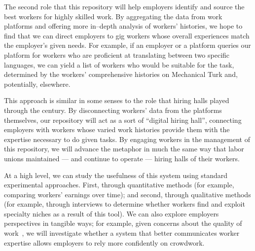 \documentclass{article}
\newcommand{\topic}[1]{{\color{Blue}#1}}
\renewcommand{\topic}[1]{{#1}}
\begin{document}
\topic{The second role that this repository will help employers identify and source the best workers for highly skilled work.}
By aggregating the data from work platforms and
offering more in--depth analysis of workers' histories, we hope to find that
we can direct employers to gig workers whose overall experiences match the employer's given needs.
For example, if an employer or a platform queries our platform for
workers who are proficient at translating between two specific languages,
we can yield a list of workers who would be suitable for the task, determined by
the workers' comprehensive histories on Mechanical Turk and, potentially, elsewhere.

\topic{This approach is similar in some senses to the role that hiring halls played through the \nth{20} century.}
By disconnecting workers' data from the platforms themselves, our repository will act as a sort of ``digital hiring hall'',
connecting employers with workers whose varied work histories provide them with the expertise necessary to do given tasks.
By engaging workers in the management of this repository, we will advance the metaphor in much the same way that
labor unions maintained --- and continue to operate --- hiring halls of their workers.


\topic{At a high level, we can study the usefulness of this system using standard experimental approaches.}
First, through quantitative methods (for example, comparing workers' earnings over time); and
second, through qualitative  methods (for example, through interviews to determine whether workers find and exploit specialty niches as a result of this tool).
We can also explore employers perspectives in tangible ways;
for example, given concerns about the quality of work~\cite{Ipeirotis:2010:QMA:1837885.1837906,le2010ensuring,Law:2017:CTR:2998181.2998197},
we will investigate whether a system that better communicates worker expertise allows employers to rely more confidently on crowdwork.
\end{document}
